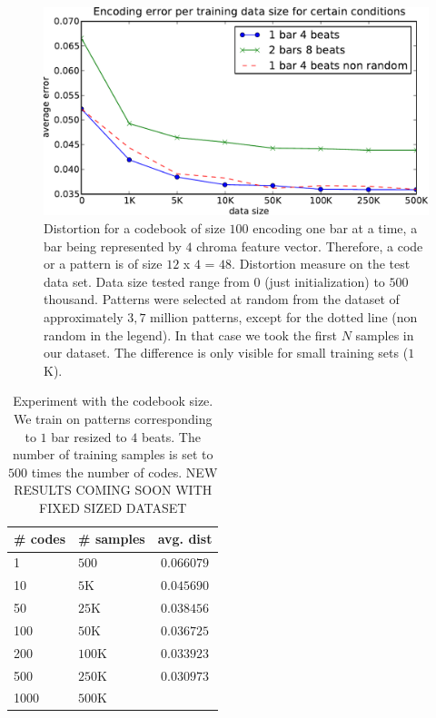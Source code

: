 \documentclass{article}
\begin{document}
\begin{figure}[htb]
\begin{center}
\includegraphics[width=.99\columnwidth]{data_sizes}
\end{center}
\caption{\small{Distortion for a codebook of size $100$ encoding one bar
at a time, a bar being represented by $4$ chroma feature vector.
Therefore, a code or a pattern is of size $12$ x $4$ = $48$.
Distortion measure on the test data set. Data size tested range
from $0$ (just initialization) to $500$ thousand. Patterns were selected at
random from the dataset of approximately $3,7$ million patterns, except
for the dotted line (non random in the legend). In that case we took the
first $N$ samples in our dataset. The difference is only visible for small
training sets ($1$K).
}}
\label{fig:data_sizes}
\end{figure}

\begin{table}
\begin{center}
\begin{tabular}{|l|l|c|}
\hline
\# codes & \# samples & avg. dist \\ \hline \hline
1 & $500$ & $0.066079$ \\
10 & $5$K & $0.045690$ \\
50 & $25$K & $0.038456$ \\
100 & $50$K & $0.036725$ \\
200 & $100$K & $0.033923$ \\
500 & $250$K & $0.030973$ \\
1000 & $500$K & \\ \hline
\end{tabular}
\end{center}
\caption{\small{Experiment with the codebook size. We train on patterns
corresponding to $1$ bar resized to $4$ beats. The number of training
samples is set to $500$ times the number of codes. 
NEW RESULTS COMING SOON WITH FIXED SIZED DATASET }}
\label{tab:cbsize}
\end{table}
\end{document}
